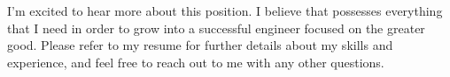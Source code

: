 I'm excited to hear more about this position. I believe
that \company{} possesses everything that I need in order to grow into a 
successful engineer focused on the greater good. Please refer to my 
resume for further details about my skills and experience, and feel free
to reach out to me with any other questions.